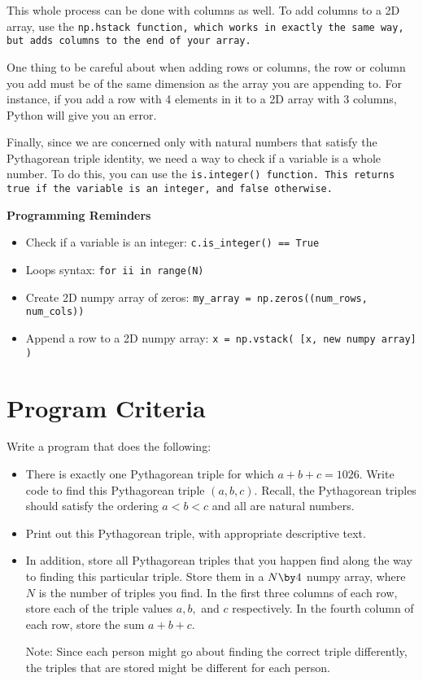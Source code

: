 \documentclass{article}
\def\prog#1{
\vspace{.1in}\begin{mdframed} \begin{center} \textbf{Programming Reminders} \end{center}#1 \end{mdframed} }
\begin{document}
	This whole process can be done with columns as well.  To add columns to a 2D array, use the \tt{np.hstack} function, which works in exactly the same way, but adds columns to the end of your array. 
	
	One thing to be careful about when adding rows or columns, the row or column you add must be of the same dimension as the array you are appending to.  For instance, if you add a row with 4 elements in it to a 2D array with 3 columns, Python will give you an error.
	
	Finally, since we are concerned only with natural numbers that satisfy the Pythagorean triple identity, we need a way to check if a variable is a whole number.  To do this, you can use the \tt{is.integer()} function.  This returns true if the variable is an integer, and false otherwise.
	
	
	
	
	
	
	
	
	\prog{
		\begin{itemize}
			\item Check if a variable is an integer: \tt{c.is\_integer() == True}
			\item Loops syntax: \tt{for ii in range(N)}
			\item Create 2D numpy array of zeros: \tt{my\_array = np.zeros((num\_rows, num\_cols))}
			\item Append a row to a 2D numpy  array: \tt{x = np.vstack( [x, new numpy array] )}
		\end{itemize}
		}




\section*{Program Criteria}
	Write a program that does the following:
	\begin{itemize}
		\item There is exactly one Pythagorean triple for which $a+b+c = 1026$.  Write code to find this Pythagorean triple $(a,b,c)$.  Recall, the Pythagorean triples should satisfy the ordering $a < b < c$ and all are natural numbers.
		\item Print out this Pythagorean triple, with appropriate descriptive text.
		\item In addition, store all Pythagorean triples that you happen find along the way to finding this particular triple.  Store them in a $N \by 4$ numpy array, where $N$ is the number of triples you find.  In the first three columns of each row, store each of the triple values $a,b,$ and $c$ respectively.  In the fourth column of each row, store the sum $a+b+c$.
		
		Note: Since each person might go about finding the correct triple differently, the triples that are stored might be different for each person.
	\end{itemize}
\end{document}
